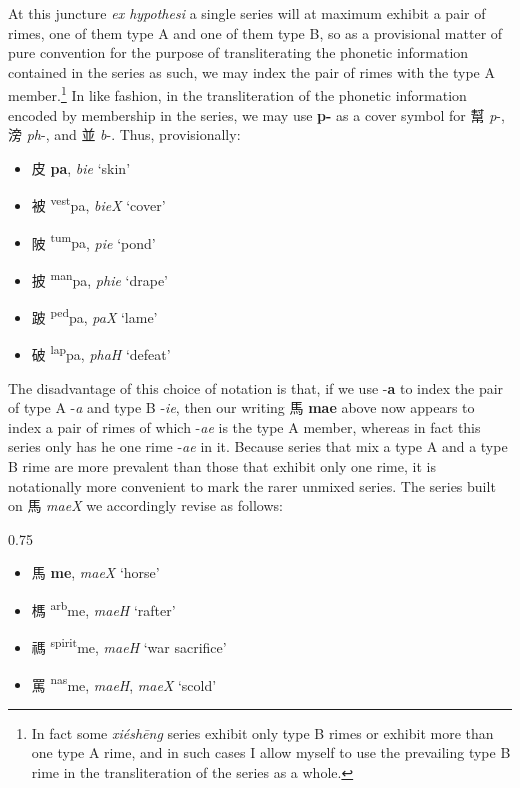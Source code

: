 At this juncture \textit{ex hypothesi} a single series will at maximum exhibit a pair of rimes, one of them type A and one of them type B, so as a provisional matter of pure convention for the purpose of transliterating the phonetic information contained in the series as such, we may index the pair of rimes with the type A member.\footnote{In fact some \textit{xiéshēng} series exhibit only type B rimes or exhibit more than one type A rime, and in such cases I allow myself to use the prevailing type B rime in the transliteration of the series as a whole.} 
In like fashion, in the transliteration of the phonetic information encoded by membership in the series, we may use \textbf{p-} as a cover symbol for 
幫 \textit{p}-, 滂 \textit{ph}-, and 並
\textit{b}-. 
Thus, provisionally:

\begin{itemize}
    \item {\Large{皮}} {\large{\textbf{pa}}}, \textit{bie} `skin'
    \item {\Large{被}} {\large{\textsuperscript{vest}pa}}, 
\textit{bieX} `cover'
    \item {\Large{陂}} {\large{\textsuperscript{tum}pa}}, \textit{pie} `pond'
    \item {\Large{披}} {\large{\textsuperscript{man}pa}}, 
\textit{phie} `drape'
    \item {\Large{跛}} {\large{\textsuperscript{ped}pa}}, \textit{paX} `lame'
    \item {\Large{破}} {\large{\textsuperscript{lap}pa}}, 
\textit{phaH} `defeat'
\end{itemize}


The disadvantage of this choice of notation is that, if we use -\textbf{a} to index the pair of type A -\textit{a} and type B -\textit{ie}, then our writing 馬 \textbf{mae} above now appears to index a pair of rimes of which -\textit{ae} is the type A member, whereas in fact this series only has he one rime -\textit{ae} in it. Because series that mix a type A and a type B rime are more prevalent than those that exhibit only one rime, it is notationally more convenient to mark the rarer unmixed series. The series built on 馬 \textit{maeX} we accordingly revise as follows: 

\begin{spacing}{0.75} 
\begin{itemize}[noitemsep]
\item {\Large{馬}} \textbf{{\large{me}}}, \textit{maeX} `horse'
\item {\Large{榪}} {\large{{\textsuperscript{arb}}me}}, \textit{maeH} `rafter'
\item {\Large{禡}} {\large{{\textsuperscript{spirit}}me}}, \textit{maeH} `war sacrifice'
\item {\Large{罵}} {\large{{\textsuperscript{nas}}me}}, \textit{maeH}, \textit{maeX} `scold'
\end{itemize}
\end{spacing}

